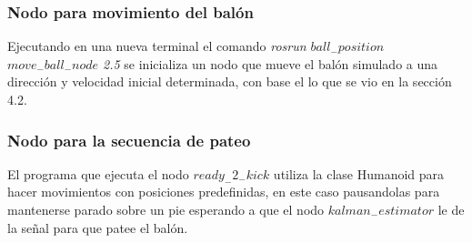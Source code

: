 			\subsubsection*{Nodo para movimiento del balón}
			Ejecutando en una nueva terminal el comando \textit{rosrun $ball_-position$ $move_-ball_-node$ 2.5} se inicializa un nodo que mueve el balón simulado a una dirección y velocidad inicial determinada, con base el lo que se vio en la sección 4.2. 
			
			\subsubsection*{Nodo para la secuencia de pateo} 
			El programa que ejecuta el nodo \textit{$ready_-2_-kick$} utiliza la clase Humanoid para hacer movimientos con posiciones predefinidas, en este caso pausandolas para mantenerse parado sobre un pie esperando a que el nodo $kalman_-estimator$ le de la señal para que patee el balón.
		
		
		
		
		
		
		
		
		
		
		